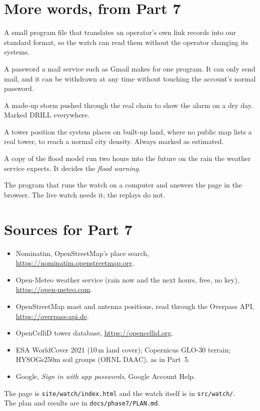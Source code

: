 \section{More words, from Part 7}
\small
\begin{description}[leftmargin=3.2cm,style=nextline,itemsep=0.25em]
\item[Adapter] A small program file that translates an operator's own link records into our standard format, so the
watch can read them without the operator changing its systems.
\item[App password] A password a mail service such as Gmail makes for one program. It can only send mail, and it can be
withdrawn at any time without touching the account's normal password.
\item[Drill] A made-up storm pushed through the real chain to show the alarm on a dry day. Marked DRILL everywhere.
\item[Estimated site] A tower position the system places on built-up land, where no public map lists a real tower, to
reach a normal city density. Always marked as estimated.
\item[Look-ahead] A copy of the flood model run two hours into the future on the rain the weather service expects. It
decides the \emph{flood warning}.
\item[Server] The program that runs the watch on a computer and answers the page in the browser. The live watch needs
it; the replays do not.
\end{description}
\normalsize

\section{Sources for Part 7}
\small
\begin{itemize}
\item Nominatim, OpenStreetMap's place search, \url{https://nominatim.openstreetmap.org}.
\item Open-Meteo weather service (rain now and the next hours, free, no key), \url{https://open-meteo.com}.
\item OpenStreetMap mast and antenna positions, read through the Overpass API, \url{https://overpass-api.de}.
\item OpenCelliD tower database, \url{https://opencellid.org}.
\item ESA WorldCover 2021 (10\,m land cover); Copernicus GLO-30 terrain; HYSOGs250m soil groups (ORNL DAAC), as in
Part~5.
\item Google, \emph{Sign in with app passwords}, Google Account Help.
\end{itemize}
The page is \texttt{site/watch/index.html} and the watch itself is in \texttt{src/watch/}.\\
The plan and results are in \texttt{docs/phase7/PLAN.md}.
\normalsize
